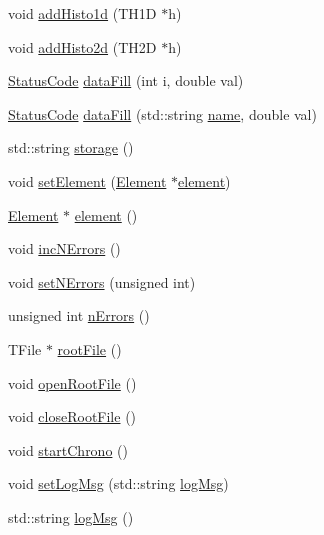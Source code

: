\begin{DoxyCompactItemize}
\item 
void \hyperlink{classProcessus_ad46e0d4dfdfdcbce001ee6be1746dfa4}{add\+Histo1d} (T\+H1D $\ast$h)
\item 
void \hyperlink{classProcessus_ac1ed1aed5edaeabdf18aa56775440471}{add\+Histo2d} (T\+H2D $\ast$h)
\item 
\hyperlink{classStatusCode}{Status\+Code} \hyperlink{classProcessus_a0d093b48f3218a088ba030e24372f18c}{data\+Fill} (int i, double val)
\item 
\hyperlink{classStatusCode}{Status\+Code} \hyperlink{classProcessus_aa31ab71711f7af6a729441ff573f69c9}{data\+Fill} (std\+::string \hyperlink{classObject_a300f4c05dd468c7bb8b3c968868443c1}{name}, double val)
\item 
std\+::string \hyperlink{classProcessus_a33fa1a0b54a636e5cdd680669fd9ea51}{storage} ()
\item 
void \hyperlink{classProcessus_a8ddef94227d83d9dae2cd49aebc33353}{set\+Element} (\hyperlink{classElement}{Element} $\ast$\hyperlink{classProcessus_a6fe155527431a7190b7d44d600b9608d}{element})
\item 
\hyperlink{classElement}{Element} $\ast$ \hyperlink{classProcessus_a6fe155527431a7190b7d44d600b9608d}{element} ()
\item 
void \hyperlink{classProcessus_abe603d0636f76db6aa6c5c60cf34c591}{inc\+N\+Errors} ()
\item 
void \hyperlink{classProcessus_a831b027b9cf18ab56fa6147b5d3055da}{set\+N\+Errors} (unsigned int)
\item 
unsigned int \hyperlink{classProcessus_a82a0487f82f07cc2c2dc2731f98149e7}{n\+Errors} ()
\item 
T\+File $\ast$ \hyperlink{classProcessus_a247e8c362ec08422cf53d08dd23b093c}{root\+File} ()
\item 
void \hyperlink{classProcessus_aacf6812880c1d1a2bf14a4a39458f443}{open\+Root\+File} ()
\item 
void \hyperlink{classProcessus_a2f3c41e99da4c738ea3d8f7b0d20a665}{close\+Root\+File} ()
\item 
void \hyperlink{classProcessus_a5e4d34b86241fa0756e07375a14ff4b2}{start\+Chrono} ()
\item 
void \hyperlink{classProcessus_a471833f89047aa9a7ff6200a31c17a1d}{set\+Log\+Msg} (std\+::string \hyperlink{classProcessus_a42fdeb17dc13ba854222666b6aa29b61}{log\+Msg})
\item 
std\+::string \hyperlink{classProcessus_a42fdeb17dc13ba854222666b6aa29b61}{log\+Msg} ()
\item 

\end{DoxyCompactItemize}
